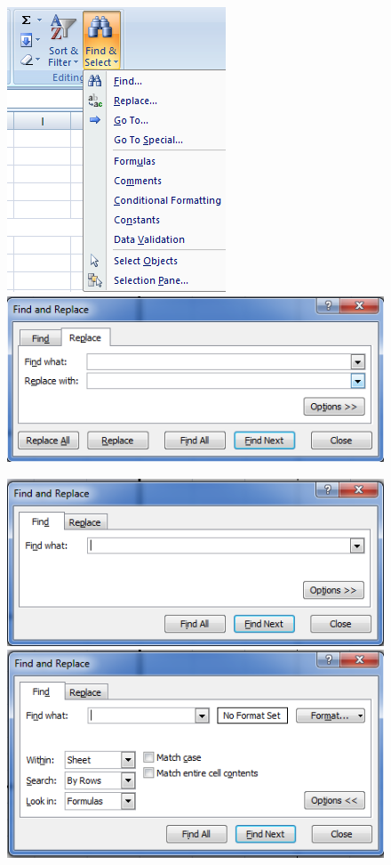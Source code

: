 \begin{figure}[H]
\centering
\includegraphics[scale=0.4]{src/images/chapter1/chapter1_fig55.png}\qquad
\includegraphics[scale=0.4]{src/images/chapter1/chapter1_fig56.png}
\end{figure}
\begin{figure}[H]
\centering
\includegraphics[scale=0.4]{src/images/chapter1/chapter1_fig57.png}\qquad
\includegraphics[scale=0.4]{src/images/chapter1/chapter1_fig58.png}
\end{figure}

